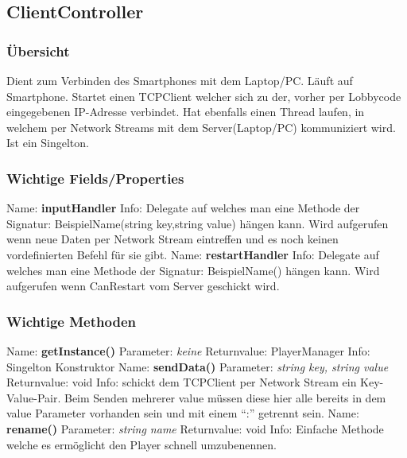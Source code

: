\subsection{ClientController}
\subsubsection{Übersicht}
Dient zum Verbinden des Smartphones mit dem Laptop/PC. Läuft auf Smartphone. Startet einen TCPClient welcher sich zu der, vorher per Lobbycode eingegebenen IP-Adresse verbindet. Hat ebenfalls einen Thread laufen, in welchem per Network Streams mit dem Server(Laptop/PC) kommuniziert wird. Ist ein Singelton.
\subsubsection{Wichtige Fields/Properties}
Name: \textbf{inputHandler}
\newline
Info: Delegate auf welches man eine Methode der Signatur: BeispielName(string key,string value) hängen kann. Wird aufgerufen wenn neue Daten per Network Stream eintreffen und es noch keinen vordefinierten Befehl für sie gibt.
\newline \newline
Name: \textbf{restartHandler}
\newline
Info: Delegate auf welches man eine Methode der Signatur: BeispielName() hängen kann. Wird aufgerufen wenn CanRestart vom Server geschickt wird.
\newline
\subsubsection{Wichtige Methoden}
Name: \textbf{getInstance()}
\newline
Parameter: \textit{keine}
\newline
Returnvalue: PlayerManager
\newline
Info: Singelton Konstruktor
\newline \newline
Name: \textbf{sendData()}
\newline
Parameter: \textit{string key, string value}
\newline
Returnvalue: void
\newline
Info: schickt dem TCPClient per Network Stream ein Key-Value-Pair. Beim Senden mehrerer value müssen diese hier alle bereits in dem value Parameter vorhanden sein und mit einem “:” getrennt sein.
\newline \newline
Name: \textbf{rename()}
\newline 
Parameter: \textit{string name}
\newline
Returnvalue: void
\newline
Info: Einfache Methode welche es ermöglicht den Player schnell umzubenennen.
\newline 
